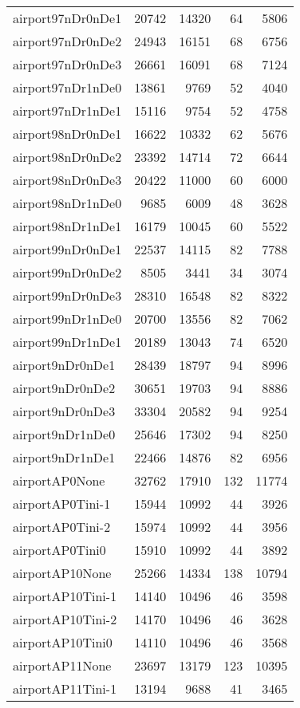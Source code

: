 \begin{longtable}{lrrrr}
airport97nDr0nDe1 & 20742 & 14320 & 64 & 5806 \\
airport97nDr0nDe2 & 24943 & 16151 & 68 & 6756 \\
airport97nDr0nDe3 & 26661 & 16091 & 68 & 7124 \\
airport97nDr1nDe0 & 13861 & 9769 & 52 & 4040 \\
airport97nDr1nDe1 & 15116 & 9754 & 52 & 4758 \\
airport98nDr0nDe1 & 16622 & 10332 & 62 & 5676 \\
airport98nDr0nDe2 & 23392 & 14714 & 72 & 6644 \\
airport98nDr0nDe3 & 20422 & 11000 & 60 & 6000 \\
airport98nDr1nDe0 & 9685 & 6009 & 48 & 3628 \\
airport98nDr1nDe1 & 16179 & 10045 & 60 & 5522 \\
airport99nDr0nDe1 & 22537 & 14115 & 82 & 7788 \\
airport99nDr0nDe2 & 8505 & 3441 & 34 & 3074 \\
airport99nDr0nDe3 & 28310 & 16548 & 82 & 8322 \\
airport99nDr1nDe0 & 20700 & 13556 & 82 & 7062 \\
airport99nDr1nDe1 & 20189 & 13043 & 74 & 6520 \\
airport9nDr0nDe1 & 28439 & 18797 & 94 & 8996 \\
airport9nDr0nDe2 & 30651 & 19703 & 94 & 8886 \\
airport9nDr0nDe3 & 33304 & 20582 & 94 & 9254 \\
airport9nDr1nDe0 & 25646 & 17302 & 94 & 8250 \\
airport9nDr1nDe1 & 22466 & 14876 & 82 & 6956 \\
airportAP0None & 32762 & 17910 & 132 & 11774 \\
airportAP0Tini-1 & 15944 & 10992 & 44 & 3926 \\
airportAP0Tini-2 & 15974 & 10992 & 44 & 3956 \\
airportAP0Tini0 & 15910 & 10992 & 44 & 3892 \\
airportAP10None & 25266 & 14334 & 138 & 10794 \\
airportAP10Tini-1 & 14140 & 10496 & 46 & 3598 \\
airportAP10Tini-2 & 14170 & 10496 & 46 & 3628 \\
airportAP10Tini0 & 14110 & 10496 & 46 & 3568 \\
airportAP11None & 23697 & 13179 & 123 & 10395 \\
airportAP11Tini-1 & 13194 & 9688 & 41 & 3465 \\

\end{longtable}
